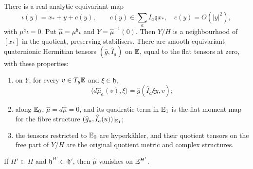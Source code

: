\begin{proposition}\label{prop:slice}
There is a real-analytic equivariant map
\[
 \iota(y)=x_*+y+c(y),\qquad
 c(y)\in\sum_a I_a\mathfrak qx_*,\quad c(y)=O(|y|^2),
\]
with $\mu^{\mathfrak q}\iota=0$. Put
$\widehat\mu=\mu^{\mathfrak h}\iota$ and $Y=\widehat\mu^{-1}(0)$.
Then $Y/H$ is a neighbourhood of $[x_*]$ in the quotient,
preserving stabilisers. There are smooth equivariant quaternionic
Hermitian tensors $(\widehat g,\widehat I_a)$ on $\mathbb E$, equal to
the flat tensors at zero, with these properties:
\begin{enumerate}
\item on $Y$, for every $v\in T_y\mathbb E$ and $\xi\in\mathfrak h$,
\begin{equation}\label{eq:slice-moment}
 \langle d\widehat\mu_a(v),\xi\rangle
 =\widehat g(\widehat I_a\xi y,v);
\end{equation}
\item along $\mathbb E_0$, $\widehat\mu=d\widehat\mu=0$, and its
quadratic term in $\mathbb E_1$ is the flat moment map for the fibre
structure $(\widehat g_u,\widehat I_a(u))|_{\mathbb E_1}$;
\item the tensors restricted to $\mathbb E_0$ are hyperk\"ahler, and
their quotient tensors on the free part of $Y/H$ are the original
quotient metric and complex structures.
\end{enumerate}
If $H'\subset H$ and $\mathfrak h^{H'}\subset\mathfrak h'$, then
$\widehat\mu$ vanishes on $\mathbb E^{H'}$.
\end{proposition}
